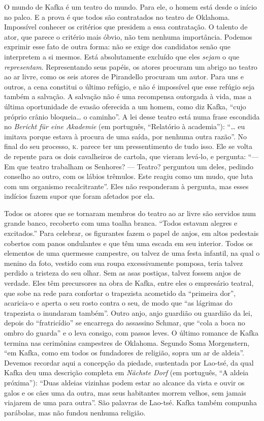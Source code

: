 O mundo de Kafka é um teatro do mundo. Para ele, o homem está desde o
início no palco. E a prova é que todos são contratados no teatro de
Oklahoma. Impossível conhecer os critérios que presidem a essa
contratação. O talento de ator, que parece o critério mais óbvio, não
tem nenhuma importância. Podemos exprimir esse fato de outra forma: não
se exige dos candidatos senão que interpretem a si mesmos. Está
absolutamente excluído que eles \textit{sejam} o que \textit{representam}.
Representando seus papéis, os atores procuram um abrigo no teatro ao ar
livre, como os seis atores de Pirandello procuram um autor. Para uns e
outros, a cena constitui o último refúgio, e não é impossível que esse
refúgio seja também a salvação. A salvação não é uma recompensa
outorgada à vida, mas a última oportunidade de evasão oferecida a um
homem, como diz Kafka, ``cujo próprio crânio bloqueia\ldots{} o caminho''. A
lei desse teatro está numa frase escondida no \textit{Bericht für eine
Akademie} (em português, ``Relatório à academia''): ``\ldots{} eu imitava porque estava à
procura de uma saída, por nenhuma outra razão''. No final do seu
processo, \textsc{k.} parece ter um pressentimento de tudo isso. Ele se volta de
repente para os dois cavalheiros de cartola, que vieram levá-lo, e
pergunta: ``--- Em que teatro trabalham os Senhores? --- Teatro?
perguntou um deles, pedindo conselho ao outro, com os lábios trêmulos.
Este reagiu como um mudo, que luta com um organismo recalcitrante''.
Eles não responderam à pergunta, mas esses indícios fazem supor que
foram afetados por ela.

Todos os atores que se tornaram membros do teatro ao ar livre são
servidos num grande banco, recoberto com uma toalha branca. ``Todos
estavam alegres e excitados.'' Para celebrar, os figurantes fazem o
papel de anjos, em altos pedestais cobertos com panos ondulantes e que
têm uma escada em seu interior. Todos os elementos de uma quermesse
campestre, ou talvez de uma festa infantil, na qual o menino da foto,
vestido com sua roupa excessivamente pomposa, teria talvez perdido a
tristeza do seu olhar. Sem as asas postiças, talvez fossem anjos de
verdade. Eles têm precursores na obra de Kafka, entre eles o empresário
teatral, que sobe na rede para confortar o trapezista acometido da
``primeira dor'', acaricia-o e aperta o seu rosto contra o seu, de modo
que ``as lágrimas do trapezista o inundaram também''. Outro anjo, anjo
guardião ou guardião da lei, depois do ``fratricídio'' se encarrega do
assassino Schmar, que ``cola a boca no ombro do guarda'' e o leva
consigo, com passos leves. O último romance de Kafka termina nas
cerimônias campestres de Oklahoma. Segundo Soma Morgenstern, ``em Kafka,
como em todos os fundadores de religião, sopra um ar de aldeia''.
Devemos recordar aqui a concepção da piedade, sustentada por Lao-tsé, da
qual Kafka deu uma descrição completa em \textit{Nächste Dorf} (em português, ``A aldeia
próxima''): ``Duas aldeias vizinhas podem estar ao alcance da vista e
ouvir os galos e os cães uma da outra, mas seus habitantes morrem
velhos, sem jamais viajarem de uma para outra''. São palavras de
Lao-tsé. Kafka também compunha parábolas, mas não fundou nenhuma
religião.

